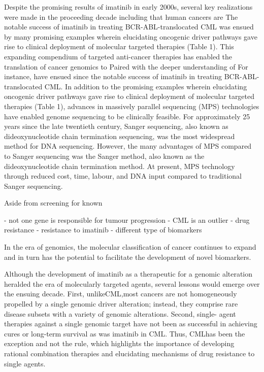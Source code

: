 Despite the promising results of imatinib in early 2000s, several key realizations were made in the proceeding decade including that human cancers are
The notable success of imatinib in treating BCR-ABL-translocated CML was ensued by many promising examples wherein elucidating oncogenic driver pathways gave rise to clinical deployment of molecular targeted therapies (Table 1). This expanding compendium of targeted anti-cancer therapies has enabled the translation of cancer genomics to Paired with the deeper understanding of For instance, have ensued since the notable success of imatinib in treating BCR-ABL-translocated CML. In addition to the promising examples wherein elucidating oncogenic driver pathways gave rise to clinical deployment of molecular targeted therapies (Table 1), advances in massively parallel sequencing (MPS) technologies have enabled genome sequencing to be clinically feasible. For approximately 25 years since the late twentieth century, Sanger sequencing, also known as dideoxynucleotide chain termination sequencing, was the most widespread method for DNA sequencing. However, the many advantages of MPS compared to Sanger sequencing was the Sanger method, also known as the dideoxynucleotide chain termination method. At present, MPS technology through reduced cost, time, labour, and DNA input compared to traditional Sanger sequencing.

Aside from screening for known

- not one gene is responsible for tumour progression - CML is an outlier
- drug resistance - resistance to imatinib
- different type of biomarkers

In the era of genomics, the molecular classification of cancer continues to expand and in turn
has the potential to facilitate the development of novel biomarkers.

Although the development of imatinib as a therapeutic for a genomic alteration heralded the
era of molecularly targeted agents, several lessons would emerge over the ensuing decade. First, unlikeCML,most cancers are not homogeneously propelled by a single genomic driver alteration; instead, they comprise rare disease subsets with a variety of genomic alterations. Second, single- agent therapies against a single genomic target have not been as successful in achieving cures or long-term survival as was imatinib in CML. Thus, CMLhas been the exception and not the rule, which highlights the importance of developing rational combination therapies and elucidating mechanisms of drug resistance to single agents.

